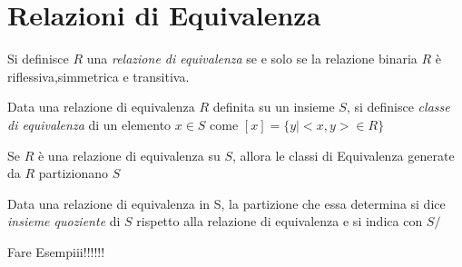 \section{Relazioni di Equivalenza}
Si definisce $R$ una \emph{relazione di equivalenza} se e solo se la relazione binaria
$R$ è riflessiva,simmetrica e transitiva.


Data una relazione di equivalenza $R$ definita su un insieme $S$, si definisce
\emph{classe di equivalenza} di un elemento $x \in S$ come $[x] = \{y | <x,y> \in R \}$

\begin{thm}
Se $R$ è una relazione di equivalenza su $S$, allora le classi di Equivalenza
generate da $R$ partizionano $S$
\end{thm}

Data una relazione di equivalenza in S, la partizione che essa determina si dice
\emph{insieme quoziente} di $S$ rispetto alla relazione di equivalenza e si indica con $S/$

Fare Esempiii!!!!!!
